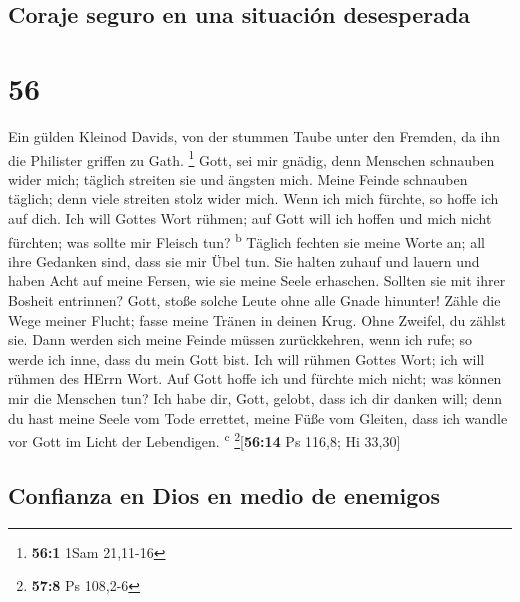 \hypertarget{coraje-seguro-en-una-situaciuxf3n-desesperada}{%
\subsection{Coraje seguro en una situación
desesperada}\label{coraje-seguro-en-una-situaciuxf3n-desesperada}}

\hypertarget{section-55}{%
\section{56}\label{section-55}}

 Ein gülden Kleinod Davids, von der stummen Taube unter
den Fremden, da ihn die Philister griffen zu Gath. \footnote{\textbf{56:1}
  1Sam 21,11-16}  Gott, sei mir gnädig, denn Menschen
schnauben wider mich; täglich streiten sie und ängsten mich.
 Meine Feinde schnauben täglich; denn viele streiten stolz
wider mich.  Wenn ich mich fürchte, so hoffe ich auf dich.
 Ich will Gottes Wort rühmen; auf Gott will ich hoffen und
mich nicht fürchten; was sollte mir Fleisch tun? \textsuperscript{b}
 Täglich fechten sie meine Worte an; all ihre Gedanken
sind, dass sie mir Übel tun.  Sie halten zuhauf und lauern
und haben Acht auf meine Fersen, wie sie meine Seele erhaschen.
 Sollten sie mit ihrer Bosheit entrinnen? Gott, stoße
solche Leute ohne alle Gnade hinunter!  Zähle die Wege
meiner Flucht; fasse meine Tränen in deinen Krug. Ohne Zweifel, du
zählst sie.  Dann werden sich meine Feinde müssen
zurückkehren, wenn ich rufe; so werde ich inne, dass du mein Gott bist.
 Ich will rühmen Gottes Wort; ich will rühmen des HErrn
Wort.  Auf Gott hoffe ich und fürchte mich nicht; was
können mir die Menschen tun?  Ich habe dir, Gott, gelobt,
dass ich dir danken will;  denn du hast meine Seele vom
Tode errettet, meine Füße vom Gleiten, dass ich wandle vor Gott im Licht
der Lebendigen. \textsuperscript{c} \footnote{\textbf{57:8} Ps 108,2-6}{[}\textbf{56:14}
Ps 116,8; Hi 33,30{]}

\hypertarget{confianza-en-dios-en-medio-de-enemigos}{%
\subsection{Confianza en Dios en medio de
enemigos}\label{confianza-en-dios-en-medio-de-enemigos}}

